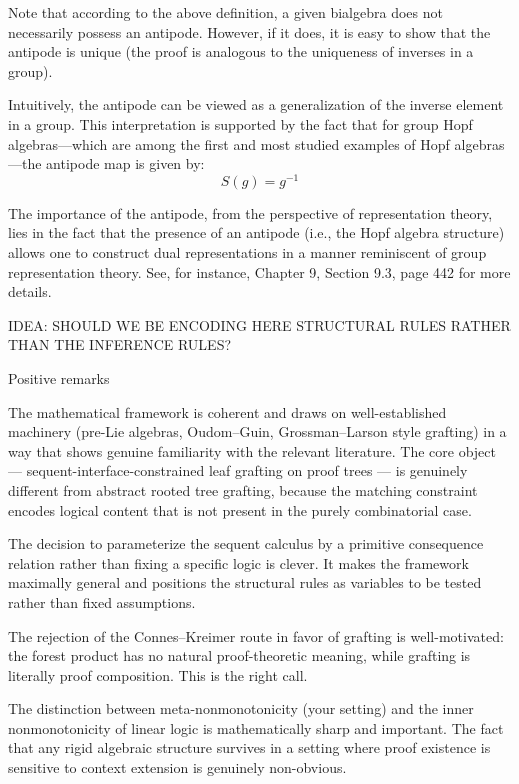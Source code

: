 \documentclass[a4paper,11pt]{report}
\begin{document}
Note that according to the above definition, a given bialgebra does not necessarily possess an antipode. However, if it does, it is easy to show that the antipode is unique (the proof is analogous to the uniqueness of inverses in a group).

Intuitively, the antipode can be viewed as a generalization of the inverse element in a group. This interpretation is supported by the fact that for group Hopf algebras—which are among the first and most studied examples of Hopf algebras—the antipode map is given by:
\[
S(g) = g^{-1}
\]

The importance of the antipode, from the perspective of representation theory, lies in the fact that the presence of an antipode (i.e., the Hopf algebra structure) allows one to construct dual representations in a manner reminiscent of group representation theory. See, for instance, Chapter 9, Section 9.3, page 442 for more details.

IDEA: SHOULD WE BE ENCODING HERE STRUCTURAL RULES RATHER THAN THE INFERENCE RULES?



Positive remarks

The mathematical framework is coherent and draws on well-established machinery (pre-Lie algebras, Oudom–Guin, Grossman–Larson style grafting) in a way that shows genuine familiarity with the relevant literature. The core object — sequent-interface-constrained leaf grafting on proof trees — is genuinely different from abstract rooted tree grafting, because the matching constraint encodes logical content that is not present in the purely combinatorial case.

The decision to parameterize the sequent calculus by a primitive consequence relation rather than fixing a specific logic is clever. It makes the framework maximally general and positions the structural rules as variables to be tested rather than fixed assumptions.

The rejection of the Connes–Kreimer route in favor of grafting is well-motivated: the forest product has no natural proof-theoretic meaning, while grafting is literally proof composition. This is the right call.

The distinction between meta-nonmonotonicity (your setting) and the inner nonmonotonicity of linear logic is mathematically sharp and important. The fact that any rigid algebraic structure survives in a setting where proof existence is sensitive to context extension is genuinely non-obvious.
\end{document}
